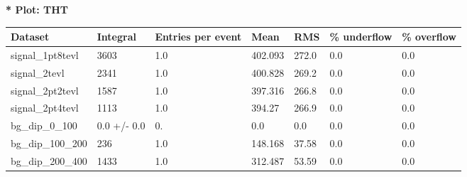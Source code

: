 \documentclass[a4paper, 10pt]{article}
\begin{document}
\textbf{* Plot: THT}\\
   \begin{table}[H]
  \begin{center}
    \begin{tabular}{|m{23.0mm}|m{23.0mm}|m{18.0mm}|m{19.0mm}|m{19.0mm}|m{19.0mm}|m{19.0mm}|}
      \hline
      {\cellcolor{yellow}         Dataset}& {\cellcolor{yellow}         Integral}& {\cellcolor{yellow}         Entries per event}& {\cellcolor{yellow}         Mean}& {\cellcolor{yellow}         RMS}& {\cellcolor{yellow}         \% underflow}& {\cellcolor{yellow}         \% overflow}\\
      \hline
      {\cellcolor{white}         signal\_1pt8tevl}& {\cellcolor{white}         3603}& {\cellcolor{white}         1.0}& {\cellcolor{white}         402.093}& {\cellcolor{white}         272.0}& {\cellcolor{green}         0.0}& {\cellcolor{green}         0.0}\\
      \hline
      {\cellcolor{white}         signal\_2tevl}& {\cellcolor{white}         2341}& {\cellcolor{white}         1.0}& {\cellcolor{white}         400.828}& {\cellcolor{white}         269.2}& {\cellcolor{green}         0.0}& {\cellcolor{green}         0.0}\\
      \hline
      {\cellcolor{white}         signal\_2pt2tevl}& {\cellcolor{white}         1587}& {\cellcolor{white}         1.0}& {\cellcolor{white}         397.316}& {\cellcolor{white}         266.8}& {\cellcolor{green}         0.0}& {\cellcolor{green}         0.0}\\
      \hline
      {\cellcolor{white}         signal\_2pt4tevl}& {\cellcolor{white}         1113}& {\cellcolor{white}         1.0}& {\cellcolor{white}         394.27}& {\cellcolor{white}         266.9}& {\cellcolor{green}         0.0}& {\cellcolor{green}         0.0}\\
      \hline
      {\cellcolor{white}         bg\_dip\_0\_100}& {\cellcolor{white}         0.0 +/\-- 0.0}& {\cellcolor{white}         0.}& {\cellcolor{white}         0.0}& {\cellcolor{white}         0.0}& {\cellcolor{green}         0.0}& {\cellcolor{green}         0.0}\\
      \hline
      {\cellcolor{white}         bg\_dip\_100\_200}& {\cellcolor{white}         236}& {\cellcolor{white}         1.0}& {\cellcolor{white}         148.168}& {\cellcolor{white}         37.58}& {\cellcolor{green}         0.0}& {\cellcolor{green}         0.0}\\
      \hline
      {\cellcolor{white}         bg\_dip\_200\_400}& {\cellcolor{white}         1433}& {\cellcolor{white}         1.0}& {\cellcolor{white}         312.487}& {\cellcolor{white}         53.59}& {\cellcolor{green}         0.0}& {\cellcolor{green}         0.0}\\

\end{tabular}
\end{center}
\end{table}
\end{document}
